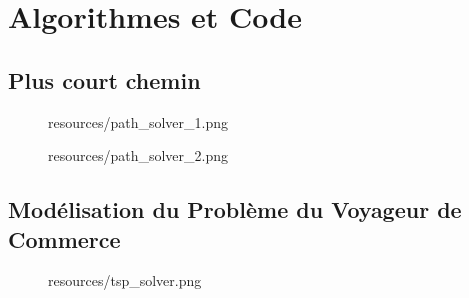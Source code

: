 \appendix
{}
\renewcommand{\thepage}{\Roman{page}}

\chapter{Algorithmes et Code}
\section{Plus court chemin}
\label{app:shortest_path_code}

\begin{figure}[H]
    \centering
    \begin{includegraphics}[width=1\textwidth]{resources/path_solver_1.png}
    \end{includegraphics}
\end{figure}

\begin{figure}[H]
    \centering
    \begin{includegraphics}[width=1\textwidth]{resources/path_solver_2.png}
    \end{includegraphics}
\end{figure}

\section{Modélisation du Problème du Voyageur de Commerce}
\label{app:tsp_model}

\begin{figure}[H]
    \centering
    \begin{includegraphics}[width=1\textwidth]{resources/tsp_solver.png}
    \end{includegraphics}
    
\end{figure}